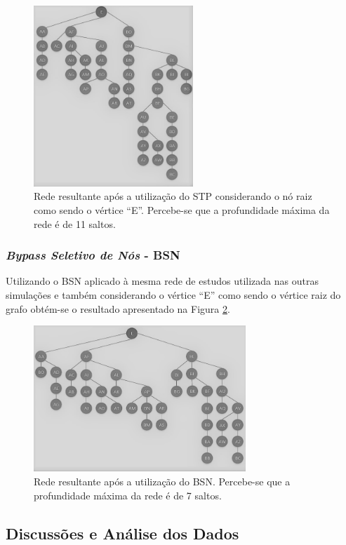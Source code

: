 \documentclass[12pt]{article}
\begin{document}
\begin{figure} %
	\centering
	\includegraphics[width=6cm]{Otimizada_STP_PB}
	\caption{Rede resultante após a utilização do STP considerando o nó raiz como sendo o vértice ``E''. Percebe-se que a profundidade máxima da rede é de 11 saltos.}
	\label{fig_rede_otimizada_STP}
\end{figure}

\subsubsection{\emph{Bypass Seletivo de Nós} - BSN}
Utilizando o BSN aplicado à mesma rede de estudos utilizada nas outras simulações e também considerando o vértice ``E'' como sendo o vértice raiz do grafo obtém-se o resultado apresentado na Figura \ref{fig_rede_otimizada_BSN}.

\begin{figure} %
	\centering
	\includegraphics[width=8cm]{Otimizada_BSN_PB}
	\caption{Rede resultante após a utilização do BSN. Percebe-se que a profundidade máxima da rede é de 7 saltos.}
	\label{fig_rede_otimizada_BSN}
\end{figure}



\subsection{Discussões e Análise dos Dados}
\end{document}

